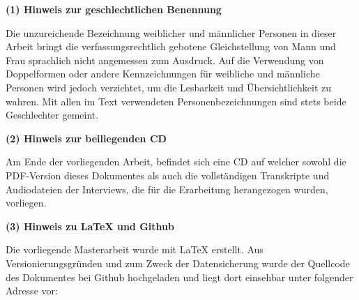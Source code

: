 \vspace*{\fill}

\begin{flushleft}
\textbf{(1) Hinweis zur geschlechtlichen Benennung}
\end{flushleft}
Die unzureichende Bezeichnung weiblicher und männlicher Personen in dieser Arbeit bringt die verfassungsrechtlich gebotene Gleichstellung von Mann und Frau sprachlich nicht angemessen zum Ausdruck. Auf die Verwendung von Doppelformen oder andere Kennzeichnungen für weibliche und männliche Personen wird jedoch verzichtet, um die Lesbarkeit und Übersichtlichkeit zu wahren. Mit allen im Text verwendeten Personenbezeichnungen sind stets beide Geschlechter gemeint.

\begin{flushleft}
\textbf{(2) Hinweis zur beiliegenden CD}
\end{flushleft}
Am Ende der vorliegenden Arbeit, befindet sich eine CD auf welcher sowohl die PDF-Version dieses Dokumentes als auch die vollständigen Transkripte und Audiodateien der Interviews, die für die Erarbeitung herangezogen wurden, vorliegen.

\begin{flushleft}
\textbf{(3) Hinweis zu LaTeX und Github}
\end{flushleft}
Die vorliegende Masterarbeit wurde mit LaTeX erstellt. Aus Versionierungsgründen und zum Zweck der Datensicherung wurde der 
Quellcode des Dokumentes bei Github hochgeladen und liegt dort einsehbar unter folgender Adresse vor: